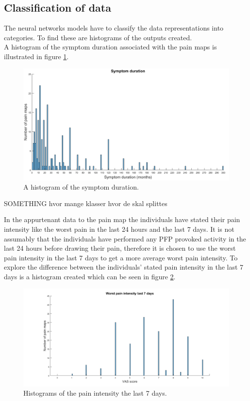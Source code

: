 \subsection{Classification of data}
The neural networks models have to classify the data representations into categories. To find these are histograms of the outputs created. \\

\noindent
A histogram of the symptom duration associated with the pain maps is illustrated in figure \ref{fig:histoduration}.

\begin{figure} [H]
\centering
\includegraphics[width=1\textwidth]{figures/histogramDuration}
\caption{A histogram of the symptom duration.}
\label{fig:histoduration}
\end{figure}

\noindent
SOMETHING
hvor mange klasser
hvor de skal splittes 


In the appurtenant data to the pain map the individuals have stated their pain intensity like the worst pain in the last 24 hours and the last 7 days. 
It is not assumably that the individuals have performed any PFP provoked activity in the last 24 hours before drawing their pain, therefore it is chosen to use the worst pain intensity in the last 7 days to get a more average worst pain intensity. 
To explore the difference between the individuals’ stated pain intensity in the last 7 days is a histogram created which can be seen in figure \ref{fig:histopain}.

\begin{figure} [H]
\centering
\includegraphics[width=1\textwidth]{figures/histrogramPain}
\caption{Histograms of the pain intensity the last 7 days.}
\label{fig:histopain}
\end{figure}

